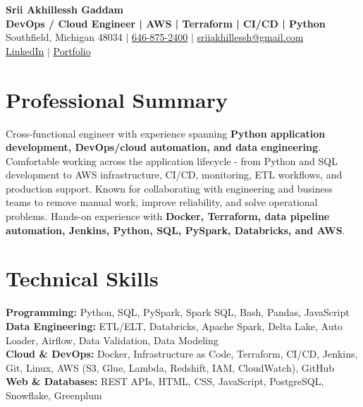 \documentclass[letterpaper,10pt]{article}
\begin{document}
\fontsize{9.35pt}{10.45pt}\selectfont

\begin{center}
    {\LARGE \textbf{Srii Akhillessh Gaddam}} \\[-1pt]
    \textbf{DevOps / Cloud Engineer | AWS | Terraform | CI/CD | Python} \\[2pt]
    Southfield, Michigan 48034 $|$
    \href{tel:6468752400}{646-875-2400} $|$
    \href{mailto:sriiakhillessh@gmail.com}{sriiakhillessh@gmail.com} \\[1pt]
    \href{https://www.linkedin.com/in/srii-akhiilessh-gaddam-b48668191/}{LinkedIn} $|$
    \href{https://sriiakhillesshg.github.io/portfolio/}{Portfolio}
\end{center}
\vspace{-8pt}

\section{Professional Summary}
\small{Cross-functional engineer with experience spanning \textbf{Python application development, DevOps/cloud automation, and data engineering}. Comfortable working across the application lifecycle - from Python and SQL development to AWS infrastructure, CI/CD, monitoring, ETL workflows, and production support. Known for collaborating with engineering and business teams to remove manual work, improve reliability, and solve operational problems. Hands-on experience with \textbf{Docker, Terraform, data pipeline automation, Jenkins, Python, SQL, PySpark, Databricks, and AWS}.}

\section{Technical Skills}
\small{
\textbf{Programming:} Python, SQL, PySpark, Spark SQL, Bash, Pandas, JavaScript \\
\textbf{Data Engineering:} ETL/ELT, Databricks, Apache Spark, Delta Lake, Auto Loader, Airflow, Data Validation, Data Modeling \\
\textbf{Cloud \& DevOps:} Docker, Infrastructure as Code, Terraform, CI/CD, Jenkins, Git, Linux, AWS (S3, Glue, Lambda, Redshift, IAM, CloudWatch), GitHub \\
\textbf{Web \& Databases:} REST APIs, HTML, CSS, JavaScript, PostgreSQL, Snowflake, Greenplum
}
\end{document}
